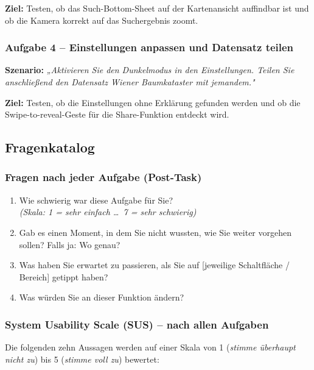 \textbf{Ziel:} Testen, ob das Such-Bottom-Sheet auf der Kartenansicht
auffindbar ist und ob die Kamera korrekt auf das Suchergebnis zoomt.

\subsubsection*{Aufgabe 4 – Einstellungen anpassen und Datensatz teilen}

\textbf{Szenario:}
\textit{„Aktivieren Sie den Dunkelmodus in den Einstellungen.
Teilen Sie anschließend den Datensatz \emph{Wiener Baumkataster}
mit jemandem."}

\textbf{Ziel:} Testen, ob die Einstellungen ohne Erklärung gefunden werden
und ob die Swipe-to-reveal-Geste für die Share-Funktion entdeckt wird.

\subsection{Fragenkatalog}

\subsubsection*{Fragen nach jeder Aufgabe (Post-Task)}

\begin{enumerate}
  \item Wie schwierig war diese Aufgabe für Sie?\\
        \textit{(Skala: 1 = sehr einfach \ldots\ 7 = sehr schwierig)}
  \item Gab es einen Moment, in dem Sie nicht wussten, wie Sie
        weiter vorgehen sollen? Falls ja: Wo genau?
  \item Was haben Sie erwartet zu passieren, als Sie auf
        [jeweilige Schaltfläche / Bereich] getippt haben?
  \item Was würden Sie an dieser Funktion ändern?
\end{enumerate}

\subsubsection*{System Usability Scale (SUS) – nach allen Aufgaben}

Die folgenden zehn Aussagen werden auf einer Skala von 1
(\textit{stimme überhaupt nicht zu}) bis 5 (\textit{stimme voll zu}) bewertet:


